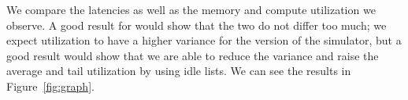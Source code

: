We compare the latencies as well as the memory and compute utilization we
observe. A good result for \sys{} would show that the two do not differ too
much; we expect utilization to have a higher variance
for the \sys{} version of the simulator, but a good result would show that we
are able to reduce the variance and raise the average and tail utilization by
using idle lists. We can see the results in Figure~\ref{fig:graph}.


